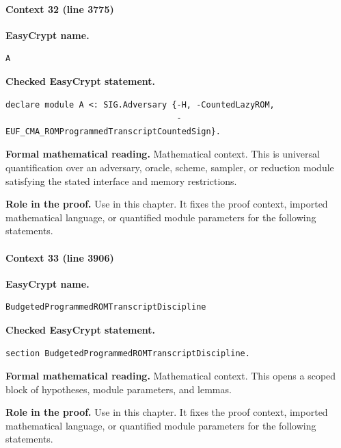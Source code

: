 \paragraph{Context 32 (line 3775)}
\noindent\textbf{EasyCrypt name.}
\begin{lstlisting}[language=EasyCrypt,basicstyle=\ttfamily\scriptsize]
A
\end{lstlisting}
\noindent\textbf{Checked EasyCrypt statement.}
\begin{lstlisting}[language=EasyCrypt,basicstyle=\ttfamily\scriptsize]
declare module A <: SIG.Adversary {-H, -CountedLazyROM,
                                   -EUF_CMA_ROMProgrammedTranscriptCountedSign}.
\end{lstlisting}
\noindent\textbf{Formal mathematical reading.}
Mathematical context. This is universal quantification over an adversary, oracle, scheme, sampler, or reduction module satisfying the stated interface and memory restrictions.

\noindent\textbf{Role in the proof.}
Use in this chapter. It fixes the proof context, imported mathematical language, or quantified module parameters for the following statements.

\paragraph{Context 33 (line 3906)}
\noindent\textbf{EasyCrypt name.}
\begin{lstlisting}[language=EasyCrypt,basicstyle=\ttfamily\scriptsize]
BudgetedProgrammedROMTranscriptDiscipline
\end{lstlisting}
\noindent\textbf{Checked EasyCrypt statement.}
\begin{lstlisting}[language=EasyCrypt,basicstyle=\ttfamily\scriptsize]
section BudgetedProgrammedROMTranscriptDiscipline.
\end{lstlisting}
\noindent\textbf{Formal mathematical reading.}
Mathematical context. This opens a scoped block of hypotheses, module parameters, and lemmas.

\noindent\textbf{Role in the proof.}
Use in this chapter. It fixes the proof context, imported mathematical language, or quantified module parameters for the following statements.

